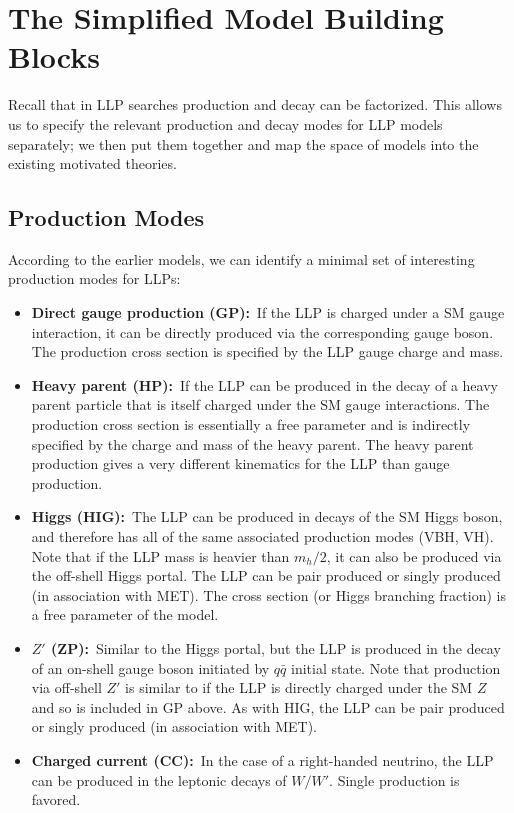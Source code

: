 \section{The Simplified Model Building Blocks}

Recall that in LLP searches production and decay can be factorized. This allows us to specify the relevant production and decay modes for LLP models separately; we then put them together and map the space of models into the existing motivated theories.

\subsection{Production Modes}
According to the earlier models, we can identify a minimal set of interesting production modes for LLPs:
%
\begin{itemize}
\item {\bf Direct gauge production (GP):}~If the LLP is charged under a SM gauge interaction, it can be directly produced via the corresponding gauge boson. The production cross section is specified by the LLP gauge charge and mass.
\item {\bf Heavy parent (HP):}~If the LLP can be produced in the decay of a heavy parent particle that is itself charged under the SM gauge interactions. The production cross section is essentially a free parameter and is indirectly specified by the charge and mass of the heavy parent. The heavy parent production gives a very different kinematics for the LLP than gauge production.
\item {\bf Higgs (HIG):}~The LLP can be produced in decays of the SM Higgs boson, and therefore has all of the same associated production modes (VBH, VH). Note that if the LLP mass is heavier than $m_h/2$, it can also be produced via the off-shell Higgs portal. The LLP can be pair produced or singly produced (in association with MET). The cross section (or Higgs branching fraction) is a free parameter of the model.
\item {\bf $Z'$ (ZP):}~Similar to the Higgs portal, but the LLP is produced in the decay of an on-shell gauge boson initiated by $q\bar{q}$ initial state. Note that production via off-shell $Z'$ is similar to if the LLP is directly charged under the SM $Z$ and so is included in GP above. As with HIG, the LLP can be pair produced or singly produced (in association with MET).
\item {\bf Charged current (CC):}~In the case of a right-handed neutrino, the LLP can be produced in the leptonic decays of $W/W'$. Single production is favored.
\end{itemize}


